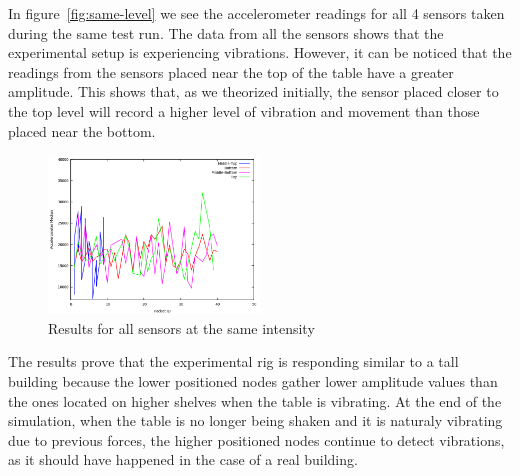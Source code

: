 In figure~\ref{fig:same-level} we see the accelerometer readings for all 4 sensors taken during the same test run. The data from all the sensors shows 
that the experimental setup is experiencing vibrations. However, it can be noticed that the readings from the sensors placed near the top of the table have a 
greater amplitude. This shows that, as we theorized initially, the sensor placed closer to the top level will record a higher level of vibration and movement than 
those placed near the bottom.

\begin{figure}[ht] \centering
  \includegraphics[width=0.5\textwidth]{img/same-level.png}
  \caption{Results for all sensors at the same intensity}
  \label{fig:same-leve}
\end{figure}

The results prove that the experimental rig is responding similar to a tall building because the lower positioned nodes gather lower amplitude values than the ones located on higher shelves 
when the table is vibrating. At the end of the simulation, when the table is no longer being shaken and it is naturaly vibrating due to previous forces, the higher positioned nodes continue 
to detect vibrations, as it should have happened in the case of a real building.
